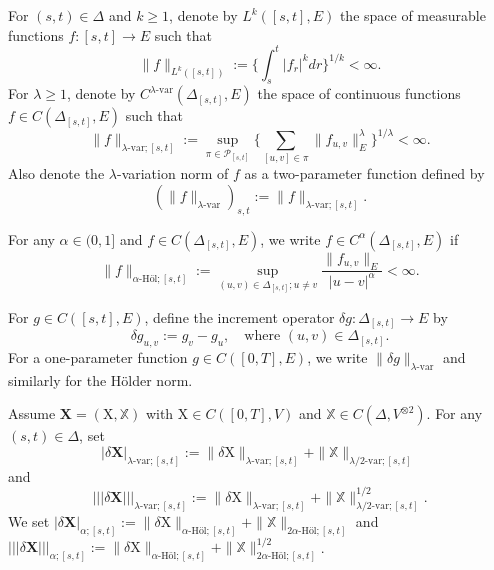 \documentclass[11pt,reqno]{amsart}
\numberwithin{equation}{section}
\newcommand{\triplenorm}[1]{%
\left|\!\left|\!\left|#1\right|\!\right|\!\right|%
}
\begin{document}
\begin{itemize}[leftmargin=1.2em, labelsep=0.2em]
For $(s,t) \in \Delta$ and $k \ge 1$, denote by $L^{k}([s,t],E)$ the space of measurable functions $f:[s,t] \to E$ such that  
\begin{equation*}
\|f\|_{L^{k}([s,t])}:=\Big\{\int_{s}^{t} |f_r|^{k} dr\Big\}^{1/k} < \infty. 
\end{equation*}
For $\lambda\ge 1$, denote by $C^{\lambda\text{-var}}(\Delta_{[s,t]},E)$ the space of continuous functions $f\in C(\Delta_{[s,t]},E)$ such that  
\begin{equation*}
\|f\|_{\lambda\text{-var};[s,t]} := \sup_{\pi\in \mathcal P_{[s,t]}}\Big\{\sum_{[u,v]\in\pi}\| f_{u,v}\|^{\lambda}_{E}\Big\}^{1/\lambda} < \infty.
\end{equation*}
Also denote the $\lambda$-variation norm of $f$ as a two-parameter function defined by   
\begin{equation*}
(\|f\|_{\lambda\text{-}\mathrm{var}})_{s,t} := \|f\|_{\lambda\text{-}\mathrm{var};[s,t]}.
\end{equation*}

For any $\alpha \in (0,1]$ and $f\in C(\Delta_{[s,t]},E)$, we write $f\in C^{\alpha}(\Delta_{[s,t]},E)$ if 
\begin{equation*}
\|f\|_{\alpha\text{-H\"ol};[s,t]}  := \sup\limits_{(u,v)\in  \Delta_{[s,t]};u\neq v} \frac{\|f_{u,v}\|_E}{|u-v|^{\alpha}}  < \infty.
\end{equation*}

For $g\in C([s,t],E)$, define the increment operator $\delta g:\Delta_{[s,t]}\to E$ by 
\begin{equation*}
\delta g_{u,v} := g_{v} - g_{u},\quad \text{where } (u,v)\in \Delta_{[s,t]}.
\end{equation*}
For a one-parameter function $g\in C([0,T],E)$, we write $\|\delta g\|_{\lambda\text{-}\mathrm{var}}$ and similarly for the H\"older norm. 

Assume $\mathbf X = (\mathrm X,\mathbb X)$ with $\mathrm X\in C([0,T],V)$ and  $\mathbb X\in C(\Delta,V^{\otimes 2})$. 
For any $(s,t)\in \Delta$, set 
\begin{equation}\label{eq:XX-norm}
|\delta \mathbf X |_{\lambda\text{-}\mathrm{var};[s,t]} := \|\delta \mathrm X\|_{\lambda\text{-}\mathrm{var};[s,t]} + \|\mathbb X\|_{\lambda/2\text{-}\mathrm{var};[s,t]} \, 
\end{equation}
and 
\[
\triplenorm{\delta \mathbf X}_{\lambda\text{-}\mathrm{var};[s,t]}
:=
\|\delta \mathrm X\|_{\lambda\text{-}\mathrm{var};[s,t]} + \|\mathbb X\|^{1/2}_{\lambda/2\text{-}\mathrm{var};[s,t]}.
\]
We set $|\delta \mathbf X |_{\alpha;[s,t]} := \|\delta \mathrm X\|_{\alpha\text{-H\"ol};[s,t]} + \|\mathbb X\|_{2\alpha\text{-H\"ol};[s,t]}$ and $\triplenorm{\delta \mathbf X}_{\alpha;[s,t]}
:=
\|\delta \mathrm X\|_{\alpha\text{-H\"ol};[s,t]} + \|\mathbb X\|^{1/2}_{2\alpha\text{-H\"ol};[s,t]}$. 


\end{itemize}
\end{document}
